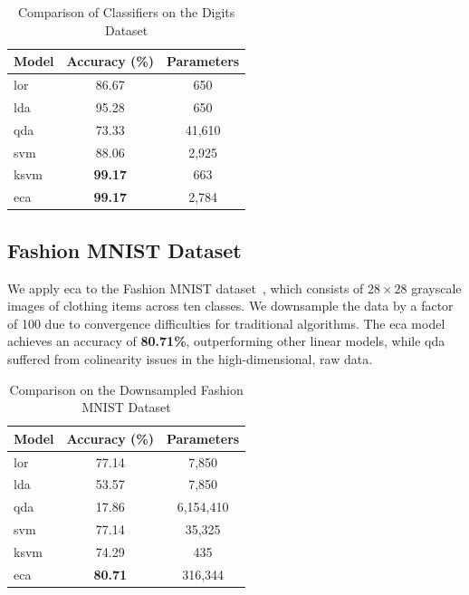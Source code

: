 \documentclass[lettersize,journal]{IEEEtran}
\begin{document}
\begin{table}[ht]
    \caption{Comparison of Classifiers on the Digits Dataset}
    \centering
    \begin{tabular}{@{}lcc@{}}
        \toprule
        \textbf{Model} & \textbf{Accuracy (\%)} & \textbf{Parameters} \\ \midrule
        \Gls{lor} & 86.67 & 650 \\
        \Gls{lda} & 95.28 & 650 \\
        \Gls{qda} & 73.33 & 41,610 \\
        \Gls{svm} & 88.06 & 2,925 \\
        \Gls{ksvm} & \textbf{99.17} & 663 \\
        \Gls{eca} & \textbf{99.17} & 2,784 \\ \bottomrule
    \end{tabular}
    \label{tab:digits}
\end{table}

\subsection{Fashion MNIST Dataset}

We apply \Gls{eca} to the Fashion MNIST dataset~\cite{xiao2017fashion}, which consists of $28 \times 28$ grayscale images of clothing items across ten classes. We downsample the data by a factor of 100 due to convergence difficulties for traditional algorithms. The \Gls{eca} model achieves an accuracy of \textbf{80.71\%}, outperforming other linear models, while \Gls{qda} suffered from colinearity issues in the high-dimensional, raw data.

\begin{table}[ht]
    \caption{Comparison on the Downsampled Fashion MNIST Dataset}
    \centering
    \begin{tabular}{@{}lcc@{}}
        \toprule
        \textbf{Model} & \textbf{Accuracy (\%)} & \textbf{Parameters} \\ \midrule
        \Gls{lor} & 77.14 & 7,850 \\
        \Gls{lda} & 53.57 & 7,850 \\
        \Gls{qda} & 17.86 & 6,154,410 \\
        \Gls{svm} & 77.14 & 35,325 \\
        \Gls{ksvm} & 74.29 & 435 \\
        \Gls{eca} & \textbf{80.71} & 316,344 \\ \bottomrule
    \end{tabular}
    \label{tab:fashion_mnist}
\end{table}
\end{document}
